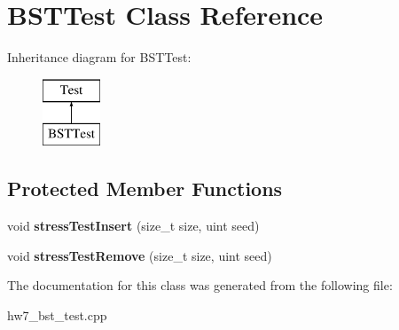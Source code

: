 \hypertarget{classBSTTest}{}\section{B\+S\+T\+Test Class Reference}
\label{classBSTTest}
Inheritance diagram for B\+S\+T\+Test\+:\begin{figure}[H]
\begin{center}
\leavevmode
\includegraphics[height=2.000000cm]{classBSTTest}
\end{center}
\end{figure}
\subsection*{Protected Member Functions}
\begin{DoxyCompactItemize}
\item 
\mbox{\label{classBSTTest_a04feda0d86547db4b515032b758b3a97}} 
void {\bfseries stress\+Test\+Insert} (size\+\_\+t size, uint seed)
\item 
\mbox{\label{classBSTTest_aac738c944fe9607ebe78f02b3343ee6c}} 
void {\bfseries stress\+Test\+Remove} (size\+\_\+t size, uint seed)
\end{DoxyCompactItemize}


The documentation for this class was generated from the following file\+:\begin{DoxyCompactItemize}
\item 
hw7\+\_\+bst\+\_\+test.\+cpp\end{DoxyCompactItemize}
